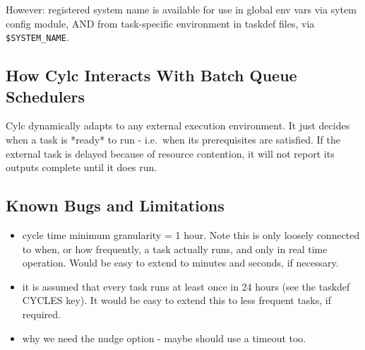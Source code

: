 \documentclass[11pt,a4paper]{article}
\begin{document}
    However: registered system name is available for use in global 
    env vars via sytem config module, AND from task-specific 
    environment in taskdef files, via \lstinline=$SYSTEM_NAME=.

\subsection{How Cylc Interacts With Batch Queue Schedulers}
\label{HowCylcInteractsWithBatchQueueSchedulers}

Cylc dynamically adapts to any external execution environment. It just
decides when a task is *ready* to run - i.e.\ when its prerequisites 
are satisfied.  If the external task is delayed because of resource
contention, it will not report its outputs complete until it does run.

\subsection{Known Bugs and Limitations}

\begin{itemize}
    \item cycle time minimum granularity = 1 hour. Note this is
        only loosely connected to when, or how frequently, a task
        actually runs, and only in real time operation. Would be easy to
        extend to minutes and seconds, if necessary.

    \item it is assumed that every task runs at least once in 24 hours
        (see the taskdef CYCLES key). It would be easy to extend this to
        less frequent tasks, if required.

    \item why we need the nudge option - maybe should use a timeout too.

\end{itemize}
\end{document}
